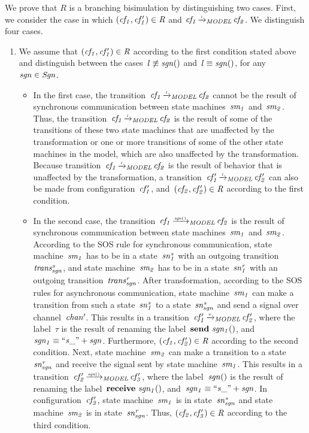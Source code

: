 %
We prove that $R$ is a branching bisimulation by distinguishing two cases.
First, we consider the case in which $(\it{cf_1}, \it{cf_1'})\in R$ and $\it{cf_1} \TextModelRelation{l} \it{cf_2}$.
We distinguish four cases.
\begin{enumerate}
\item
We assume that $(\it{cf_1}, \it{cf_1'})\in R$ according to the first condition stated above and distinguish between the cases~$l \not \equiv \it{sgn}()$ and~$l \equiv \it{sgn}()$, for any~$\it{sgn} \in \it{Sgn}$.
\begin{itemize}
\item
In the first case, the transition~$\it{cf_1} \TextModelRelation{l} \it{cf_2}$ cannot be the result of synchronous communication between state machines~$\it{sm_1}$ and~$\it{sm_2}$.
Thus, the transition~$\it{cf_1} \TextModelRelation{l} \it{cf_2}$ is the result of some of the transitions of these two state machines that are unaffected by the transformation or one or more transitions of some of the other state machines in the model, which are also unaffected by the transformation.
Because transition~$\it{cf_1} \TextModelRelation{l} \it{cf_2}$ is the result of behavior that is unaffected by the transformation, a transition~$\it{cf'_1} \TextModelRelation{l} \it{cf'_2}$ can also be made from configuration~$\it{cf'_1}$, and~$(\it{cf_2}, \it{cf_2'})\in R$ according to the first condition.
\item
In the second case, the transition~$\it{cf_1} \TextModelRelation{\it{sgn}()} \it{cf_2}$ is the result of synchronous communication between state machines~$\it{sm_1}$ and~$\it{sm_2}$.
According to the SOS rule for synchronous communication, state machine~$\it{sm_1}$ has to be in a state~$\it{sn^s_1}$ with an outgoing transition~$\it{trans^s_{sgn}}$, and state machine~$\it{sm_2}$ has to be in a state~$\it{sn^r_1}$ with an outgoing transition~$\it{trans^r_{sgn}}$.
After transformation, according to the SOS rules for asynchronous communication, state machine~$\it{sm_1}$ can make a transition from such a state~$\it{sn^s_1}$ to a state~$\it{sn^s_{sgn}}$ and send a signal over channel~$\it{chan'}$.
This results in a transition~$\it{cf'_1} \TextModelRelation{\tau} \it{cf'_2}$,
where the label~$\tau$ is the result of renaming the label~$\textbf{send}\ \it{sgn_1}()$, and~$\it{sgn_1} \equiv ``s\_" + \it{sgn}$.
Furthermore, $(\it{cf_1}, \it{cf'_2})\in R$ according to the second condition.
Next, state machine~$\it{sm_2}$ can make a transition to a state~$\it{sn^r_{sgn}}$ and receive the signal sent by state machine~$\it{sm_1}$.
This results in a transition~$\it{cf'_2} \TextModelRelation{\it{sgn}()} \it{cf'_3}$,
where the label~$\it{sgn}()$ is the result of renaming the label~$\textbf{receive}\ \it{sgn_1}()$, and~$\it{sgn_1} \equiv ``s\_" + \it{sgn}$.
In configuration~$\it{cf'_3}$, state machine~$\it{sm_1}$ is in state~$\it{sn^s_{sgn}}$ and state machine~$\it{sm_2}$ is in state~$\it{sn^r_{sgn}}$.
Thus, $(\it{cf_2}, \it{cf_3'})\in R$ according to the third condition.
\end{itemize}


\end{enumerate}
